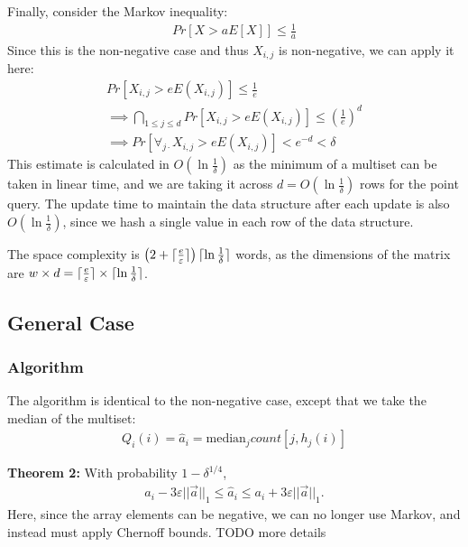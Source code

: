 \documentclass[11pt]{article}
\newcommand{\comment}[1]{}
\newcommand{\sq}{\mathit{Q}_i}
\DeclarePairedDelimiter\ceil{\lceil}{\rceil}
\begin{document}
\pagebreak
Finally, consider the Markov inequality:
\begin{align}
    Pr[X > aE[X]] \leq \frac{1}{a}
\end{align}
Since this is the non-negative case and thus $X_{i, j}$ is non-negative, we can apply it here:
\begin{align}
    Pr[X_{i, j} > e E(X_{i, j})] \leq \frac{1}{e} \\
    \implies \bigcap_{1 \leq j \leq d} Pr[X_{i, j} > e E(X_{i, j})] \leq \left(\frac{1}{e}\right)^d \\
    \implies Pr[\forall_{j \cdot} X_{i, j} > e E(X_{i, j})] \comment{\leq \frac{E(X_{i, j})}{a_i + \varepsilon||a||_1} \leq \frac{\ceil{\frac{\varepsilon}{e}} ||\vec{a}||_1}{a_i + \varepsilon||a||_1}}
      < e^{-d} < \delta
\end{align}
This estimate is calculated in $O(\ln \frac{1}{\delta})$ as the minimum of a multiset can be taken in linear time, and we are taking it across $d = O(\ln \frac{1}{\delta})$ rows for the point query.  The update time to maintain the data structure after each update is also $O(\ln \frac{1}{\delta})$, since we hash a single value in each row of the data structure.

The space complexity is $\left(2 + \ceil{\frac{e}{\varepsilon}}\right)\ceil{\ln \frac{1}{\delta}}$ words, as the dimensions of the matrix are 
$w \times d = \ceil{\frac{e}{\varepsilon}}\times\ceil{\ln \frac{1}{\delta}}$.

\comment{All previous analyses of sketch algorithm use Chebyshev in their estimation analysis, yielding a dependency on
$\frac{1}{\varepsilon^2}$ for the space complexity.  Using Markov in this analysis yields a tighter bound,
with a dependency $\frac{1}{\varepsilon}$.}

\subsection{General Case}
\subsubsection{Algorithm}
The algorithm is identical to the non-negative case, except that we take the median of the multiset:
\begin{align}
    \sq(i) = \hat{a}_i = \text{median}_j count[j, h_j(i)]
\end{align}

\textbf{Theorem 2:} With probability $1 - \delta^{1/4}$,
\begin{align}
    a_i - 3\varepsilon||\vec{a}||_1 \leq \hat{a}_i \leq a_i + 3\varepsilon||\vec{a}||_1. 
\end{align}
Here, since the array elements can be negative, we can no longer use Markov, and instead must apply Chernoff
bounds. TODO more details
\end{document}
